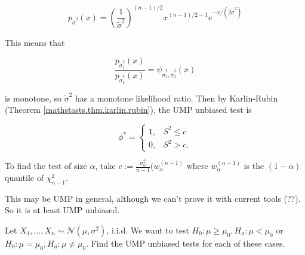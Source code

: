 \begin{solution}
\[
p_{\tilde{\sigma}^2}(x) = \left( \frac{1}{\tilde{\sigma}^2} \right)^{(n-1)/2} x^{(n-1)/2 - 1} e^{- x/(2 \tilde{\sigma}^2)}
\]

This means that 

\[
\frac{p_{\tilde{\sigma}_1^2}(x) }{p_{\tilde{\sigma}_2^2}(x) } = \psi_{\tilde{\sigma}_1^2, \tilde{\sigma}_2^2}(x)
\]

is monotone, so \(\tilde{\sigma}^2\) has a monotone likelihood ratio. Then by Karlin-Rubin (Theorem \ref{mathstasts.thm.karlin.rubin}), the UMP unbiased test is 

\[
\phi^* = \begin{cases}
1, & S^2 \leq c \\
0, & S^2 > c.
\end{cases}
\]

To find the test of size \(\alpha\), take \(c := \frac{\sigma_0^2}{n-1} (w_\alpha^{(n-1)}\)  where \(w_\alpha^{(n-1)}\) is the \((1- \alpha)\) quantile of \(\chi_{n-1}^2\). 

\end{solution}

\begin{remark}

This may be UMP in general, although we can't prove it with current tools (??). So it is at least UMP unbiased. 

\end{remark}

\begin{example}

Let \(X_1, \ldots, X_n \sim \mathcal{N}(\mu, \sigma^2)\), i.i.d. We want to test \(H_0: \mu \geq \mu_0, H_a: \mu < \mu_0\) or \(H_0: \mu = \mu_0, H_a: \mu \neq \mu_0\). Find the UMP unbiased tests for each of these cases.

\end{example}


